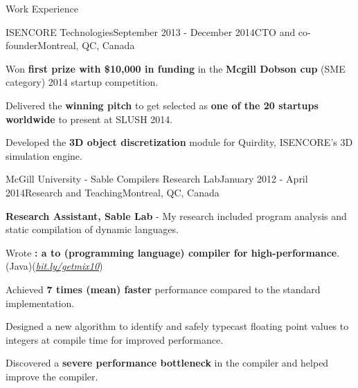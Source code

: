 \documentclass{resume} %
\begin{document}
\begin{rSection}{Work Experience}
\begin{rSubsection}{ISENCORE Technologies}{September 2013 - December 2014}{CTO
        and co-founder}{Montreal, QC, Canada}
\item Won \textbf{first prize with \$10,000 in funding} in the \textbf{Mcgill
        Dobson cup} (SME category) 2014 startup competition. 
\item Delivered the \textbf{winning pitch} to get selected as \textbf{one of
        the 20 startups worldwide} to present at SLUSH 2014.
\item Developed the \textbf{3D object discretization} module for
        Quirdity, ISENCORE's 3D simulation engine. 
\end{rSubsection}

\begin{rSubsection}{McGill University - Sable Compilers Research Lab}{January
        2012 - April 2014}{Research and Teaching}{Montreal, QC, Canada} 
\item \textbf{Research Assistant, Sable Lab} - My research included program
        analysis and static compilation of dynamic languages.

\begin{lsubSubsection}
\item Wrote \textbf{\mixtenx: a \matlab to \xten (programming language) compiler for
        high-performance}. (Java)(\href{http://bit.ly/getmix10}{\em{bit.ly/getmix10}})  
\item Achieved \textbf{7 times (mean) faster} performance compared to the
        standard \matlab implementation.
\item Designed a new algorithm to identify and safely typecast
        floating point values to integers at compile time for improved
        performance.
\item Discovered a \textbf{severe performance bottleneck} in the \xten compiler
        and helped improve the \xten compiler.  
\end{lsubSubsection}
\end{rSubsection}


\end{rSection}
\end{document}
